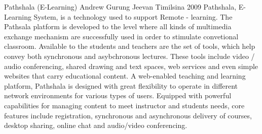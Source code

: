  \begin{conf-abstract}[]
{Pathshala (E-Learning) }
{
Andrew Gurung
Jeevan Timilsina
}
{2009 }
 Pathshala, E-Learning System, is a technology used to support Remote - learning. The Pathsala platform is developed to the level where all kinds of multimedia exchange mechanism are successfully used in order to stimulate convetional classroom. Available to the students and teachers are the set of tools, which help convey both synchronous and asybchronous lectures. These tools include video / audio conferencing, shared drawing and text spaces, web services and even simple websites that  carry educational content. A web-enabled  teaching and learning platform, Pathshala is designed with great flexibility to operate in different network environments for various types of users. Equipped with powerful capabilities for managing content to meet instructor and students needs, core features include registration, synchronous and asynchronous delivery of courses, desktop sharing, online chat and audio/video conferencing.  
  \end{conf-abstract}